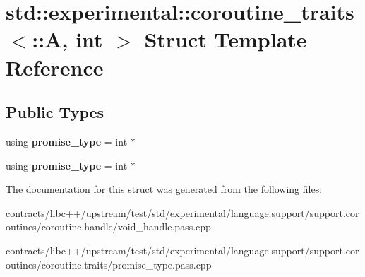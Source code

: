 \hypertarget{structstd_1_1experimental_1_1coroutine__traits_3_1_1_a_00_01int_01_4}{}\section{std\+:\+:experimental\+:\+:coroutine\+\_\+traits$<$\+:\+:A, int $>$ Struct Template Reference}
\label{structstd_1_1experimental_1_1coroutine__traits_3_1_1_a_00_01int_01_4}
\subsection*{Public Types}
\begin{DoxyCompactItemize}
\item 
\mbox{\label{structstd_1_1experimental_1_1coroutine__traits_3_1_1_a_00_01int_01_4_aa1f82a43889dc11d171dc787651b219a}} 
using {\bfseries promise\+\_\+type} = int $\ast$
\item 
\mbox{\label{structstd_1_1experimental_1_1coroutine__traits_3_1_1_a_00_01int_01_4_aa1f82a43889dc11d171dc787651b219a}} 
using {\bfseries promise\+\_\+type} = int $\ast$
\end{DoxyCompactItemize}


The documentation for this struct was generated from the following files\+:\begin{DoxyCompactItemize}
\item 
contracts/libc++/upstream/test/std/experimental/language.\+support/support.\+coroutines/coroutine.\+handle/void\+\_\+handle.\+pass.\+cpp\item 
contracts/libc++/upstream/test/std/experimental/language.\+support/support.\+coroutines/coroutine.\+traits/promise\+\_\+type.\+pass.\+cpp\end{DoxyCompactItemize}
